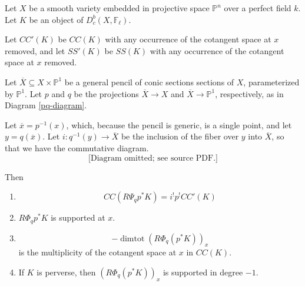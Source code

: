 \begin{lemma}
\notready\label{final-nearby-formula} Let $X$ be a smooth variety embedded in projective space $\mathbb P^n$ over a perfect field $k$. Let $K$ be an object of $D^b_c(X, \mathbb F_\ell)$.

Let $CC'(K)$ be $CC(K)$ with any occurrence of the cotangent space at $x$ removed, and let $SS'(K)$ be $SS(K)$ with any occurrence of the cotangent space at $x$ removed.


Let $\overline{X} \subseteq X \times \mathbb P^1$ be a general pencil of conic sections sections of $X$, parameterized by $\mathbb P^1$.  Let $p$ and $q$ be the projections $\overline{X} \to X$ and $\overline{X} \to \mathbb P^1$, respectively, as in Diagram \ref{pq-diagram}.

Let $\overline{x} = p^{-1}(x)$, which, because the pencil is generic, is a single point, and let $y= q(\overline{x})$. Let $i : q^{-1}(y) \to \overline{X}$ be the inclusion of the fiber over $y$ into $\overline{X}$, so that we have the commutative diagram. \begin{equation}\label{pqi-diagram}\text{[Diagram omitted; see source PDF.]} \end{equation}

Then

\begin{enumerate}

\item \[ CC ( R \Psi_{q} p^*K) = i^! p^! CC'(K)\]

\item  $R\Phi_q p^* K$ is supported at $x$.

\item  \[-\operatorname{dimtot}  \left( R\Phi_q ( p^* K) \right)_x  \] is the multiplicity of the cotangent space at $x$ in $CC(K)$.

\item If $K$ is perverse, then  $\left( R\Phi_q ( p^* K) \right)_x $ is supported in degree $-1$.

\end{enumerate}
  \end{lemma}

